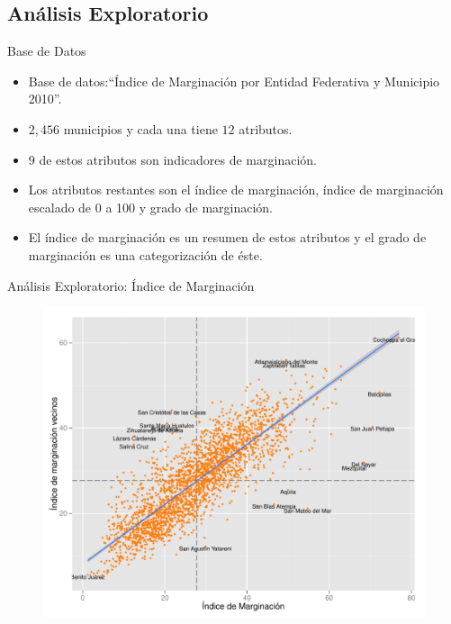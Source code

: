 \documentclass{beamer}
\begin{document}
\subsection{Análisis Exploratorio}
\begin{frame}{Base de Datos}
  \begin{itemize}
  \item Base de datos:``Índice de Marginación por Entidad Federativa y Municipio 2010''. 
  \item $2,456$ municipios y cada una tiene $12$ atributos.
  \item 9 de estos atributos son indicadores de marginación. 
  \item Los atributos restantes son el índice de marginación, índice de marginación escalado de 0 a 100 y grado de marginación. 
  \item El índice de marginación es un resumen de estos atributos y el grado de marginación es una categorización de éste.
  \end{itemize}
\end{frame}

\begin{frame}{Análisis Exploratorio: Índice de Marginación}
  \begin{figure}[!ht]
  \centering
  \includegraphics[width=.8\textwidth]{./plots/moran_plot.pdf} \\
 
  \end{figure}
\end{frame}
\end{document}
